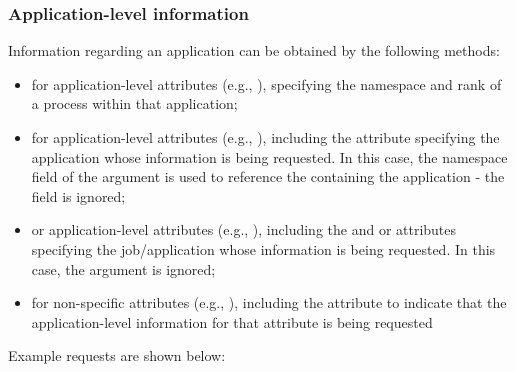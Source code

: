 \subsubsection{Application-level information}

Information regarding an application can be obtained by the following methods:

\begin{itemize}
\item for application-level attributes (e.g., ), specifying the namespace and rank of a process within that application;
\item for application-level attributes (e.g., ), including the  attribute specifying the application whose information is being requested. In this case, the namespace field of the  argument is used to reference the  containing the application - the  field is ignored;
\item or application-level attributes (e.g., ), including the  and  or  attributes specifying the job/application whose information is being requested. In this case, the  argument is ignored;
\item for non-specific attributes (e.g., ), including the  attribute to indicate that the application-level information for that attribute is being requested
\end{itemize}

Example requests are shown below:


